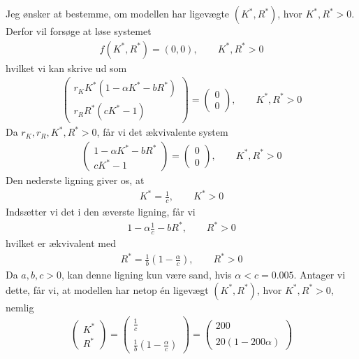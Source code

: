 \documentclass[12pt]{article}
\begin{document}
Jeg ønsker at bestemme, om modellen har ligevægte $(K^*, R^*)$, hvor $K^*, R^*>0$. Derfor vil forsøge at løse systemet
\begin{align}
f(K^*, R^*) = (0,0), \qquad K^*, R^*>0
\end{align}
hvilket vi kan skrive ud som
\begin{align}
\begin{pmatrix}
r_K K^* (1 - \alpha K^* - bR^*) \\ 
r_R R^* (cK^* - 1)
\end{pmatrix} =
\begin{pmatrix}
0 \\ 0
\end{pmatrix}, \qquad K^*, R^*>0
\end{align}
Da $r_K, r_R, K^*, R^*>0$, får vi det ækvivalente system
\begin{align}
\begin{pmatrix}
1 - \alpha K^* - bR^* \\ 
cK^* - 1
\end{pmatrix} =
\begin{pmatrix}
0 \\ 0
\end{pmatrix}, \qquad K^*, R^*>0
\end{align}
Den nederste ligning giver os, at
\begin{align}
K^* = \frac{1}{c}, \qquad K^* >0
\end{align}
Indsætter vi det i den æverste ligning, får vi
\begin{align}
1 - \alpha \frac{1}{c} - bR^*, \qquad R^*>0
\end{align}
hvilket er ækvivalent med
\begin{align}
R^* = \frac{1}{b}\left( 1 - \frac{\alpha}{c} \right), \qquad R^*>0
\end{align}
Da $a,b,c>0$, kan denne ligning kun være sand, hvis $\alpha<c=0.005$. Antager vi dette, får vi, at modellen har netop én ligevægt $(K^*, R^*)$, hvor $K^*, R^*>0$, nemlig
\begin{align}
\begin{pmatrix}
K^* \\ R^* 
\end{pmatrix} = \begin{pmatrix}
\frac{1}{c} \\ \\ 
\frac{1}{b}\left( 1 - \frac{\alpha}{c} \right)
\end{pmatrix} = \begin{pmatrix}
200 \\ \\
20\left( 1 - 200\alpha \right)
\end{pmatrix}
\end{align}
\end{document}
